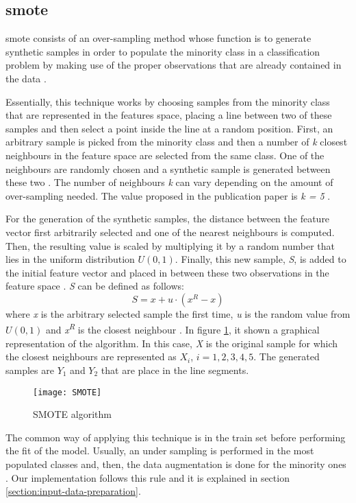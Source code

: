 
\subsection{\acrfull{smote}}
\label{subsection:smote}

	\acrshort{smote} consists of an over-sampling method whose function is to generate synthetic samples in order to populate the minority class in a classification problem by making use of the proper observations that are already contained in the data \cite{Chawla2002}. 
	
	Essentially, this technique works by choosing samples from the minority class that are represented in the features space, placing a line between two of these samples and then select a point inside the line at a random position. First, an arbitrary sample is picked from the minority class and then a number of \textit{k} closest neighbours in the feature space are selected from the same class. One of the neighbours are randomly chosen and a synthetic sample is generated between these two \cite{Browniee2020}. The number of neighbours \textit{k} can vary depending on the amount of over-sampling needed. The value proposed in the publication paper is \textit{k = 5} \cite{Chawla2002}. 
	
	For the generation of the synthetic samples, the distance between the feature vector first arbitrarily selected and one of the nearest neighbours is computed. Then, the resulting value is scaled by multiplying it by a random number that lies in the uniform distribution $U(0,1)$. Finally, this new sample, \textit{S}, is added to the initial feature vector and placed in between these two observations in the feature space \cite{Chawla2002}. \textit{S} can be defined as follows:
	\[S = x + u\cdot(x^{R} - x) \]
	where \textit{x} is the arbitrary selected sample the first time, \textit{u} is the random value from $U(0,1)$ and \textit{x\textsuperscript{R}} is the closest neighbour \cite{Blagus2013}. In figure \ref{fig:mesh47}, it shown a graphical representation of the algorithm. In this case, \textit{X} is the original sample for which the closest neighbours are represented as $X_{i}$, $i=1,2,3,4,5$. The generated samples are $Y_{1}$ and $Y_{2}$ that are place in the line segments.
	
	\begin{figure}
		\centering
		\captionsetup{justification=centering}
		\texttt{[image: SMOTE]}
		\caption{SMOTE algorithm \cite{Xie2015}}
		\label{fig:mesh47}
	\end{figure}

	The common way of applying this technique is in the train set before performing the fit of the model. Usually, an under sampling is performed in the most populated classes and, then, the data augmentation is done for the minority ones \cite{Browniee2020}. Our implementation follows this rule and it is explained in section \ref{section:input-data-preparation}.
	
	 